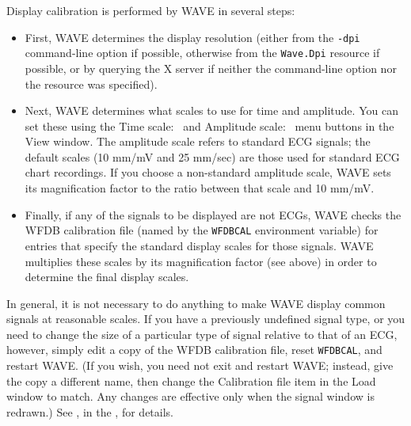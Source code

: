 \documentclass[twoside]{book}
\newcommand{\keycap}[1]{\cornersize{.5}\Ovalbox{\small\sf #1}}
\newcommand{\amenubutton}[1]{{\sf #1}~\keycap{\ensuremath{\nabla}}}
\newcommand{\WAVE}{{\sf WAVE}\xspace}
\begin{document}
Display calibration is performed by \WAVE{} in several steps:

\begin{itemize}

\index{dpi option for WAVE@{\tt -dpi} option for \WAVE{}}
\item
First, \WAVE{} determines the display resolution (either 
from the {\tt -dpi} com\-mand-line option if possible, otherwise from the
{\tt Wave.Dpi} resource if possible, or by querying the X server if
neither the command-line option nor the resource was specified).

\item
Next, \WAVE{} determines what scales to use for time and amplitude.  You
can set these using the \amenubutton{Time scale:} and \amenubutton{Amplitude
scale:} menu buttons in the {\sf View} window.  The amplitude scale refers to
standard ECG signals; the default scales (10 mm/mV and 25 mm/sec) are those
used for standard ECG chart recordings.  If you choose a non-standard amplitude
scale, \WAVE{} sets its magnification factor to the ratio between that
scale and 10 mm/mV.

\item
Finally, if any of the signals to be displayed are not ECGs, \WAVE{} checks
the WFDB calibration file (named by the {\tt WFDBCAL} environment variable) for
entries that specify the standard display scales for those signals.  \WAVE{}
multiplies these scales by its magnification factor (see above) in order to
determine the final display scales.

\end{itemize}

In general, it is not necessary to do anything to make \WAVE{} display
common signals at reasonable scales.  If you have a previously undefined signal
type, or you need to change the size of a particular type of signal relative to
that of an ECG, however, simply edit a copy of the WFDB calibration file, reset
{\tt WFDBCAL}, and restart \WAVE{}.  (If you wish, you need not exit and
restart \WAVE{};  instead, give the copy a different name, then change the
{\sf Calibration file} item in the {\sf Load} window to match.  Any changes are
effective only when the signal window is redrawn.)  See 
,
in the 
,
for details.
\end{document}
